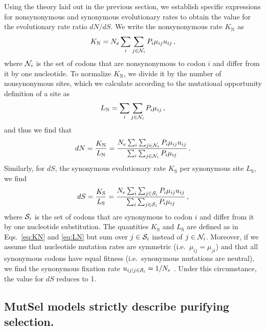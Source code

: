 \documentclass[11pt]{article}
\begin{document}
Using the theory laid out in the previous section, we establish specific expressions for nonsynonymous and synonymous evolutionary rates to obtain the value for the evolutionary rate ratio $dN/dS$. We write the nonsynonymous rate $K_\text{N}$ as 
\begin{equation}\label{eq:KN}
	K_\text{N} = N_e \sum_i \sum_{j \in {\cal N}_i} P_i \mu_{ij} u_{ij} \,,
\end{equation}
where ${\cal N}_i$ is the set of codons that are nonsynonymous to codon $i$ and differ from it by one nucleotide. To normalize $K_\text{N}$, we divide it by the number of nonsynonymous sites, which we calculate according to the mutational opportunity definition of a site \cite{GoldmanYang1994, Yang2006} as 
\begin{equation}\label{eq:LN}
	L_\text{N} = \sum_i \sum_{j \in {\cal N}_i} P_i \mu_{ij}\,, 
\end{equation} and thus we find that 
\begin{equation}\label{eq:dN}
	dN = \frac{K_\text{N}}{L_\text{N}}=\frac{N_e \sum_i \sum_{j \in {\cal N}_i} P_i \mu_{ij} u_{ij} } {\sum_i \sum_{j \in {\cal N}_i}P_i \mu_{ij}}\,.
\end{equation} Similarly, for $dS$, the synonymous evolutionary rate $K_\text{S}$ per synonymous site $L_\text{S}$, we find
\begin{equation}\label{eq:dS}
	dS = \frac{K_\text{S}}{L_\text{S}}=\frac{ N_e \sum_i \sum_{j \in {\cal S}_i} P_i \mu_{ij} u_{ij} } {\sum_i \sum_{j \in {\cal S}_i} P_i \mu_{ij} }\,,
\end{equation}
where ${\cal S}_i$ is the set of codons that are synonymous to codon $i$ and differ from it by one nucleotide substitution. The quantities $K_\text{S}$ and $L_\text{S}$ are defined as in Eqs.~\eqref{eq:KN} and \eqref{eq:LN} but sum over $j\in {\cal S}_i$ instead of $j\in {\cal N}_i$. Moreover, if we assume that nucleotide mutation rates are symmetric (i.e.\ $\mu_{ij} = \mu_{ji}$) and that all synonymous codons have equal fitness (i.e.\ synonymous mutations are neutral), we find the synonymous fixation rate $u_{ij | j \in {\cal S}_i} = 1/N_e$ \cite{CrowKimura1970}. Under this circumstance, the value for $dS$ reduces to 1.
		
				
\subsection*{MutSel models strictly describe purifying selection.}
\end{document}
